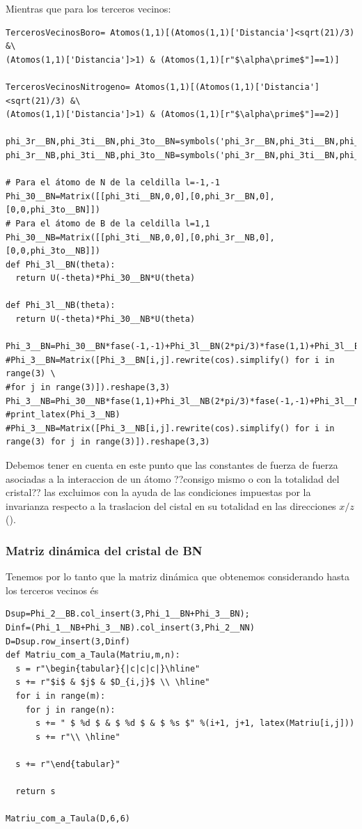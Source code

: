 \documentclass[12pt,a4paper]{article}
\begin{document}
\newpage

Mientras que para los terceros vecinos:
\begin{verbatim}
TercerosVecinosBoro= Atomos(1,1)[(Atomos(1,1)['Distancia']<sqrt(21)/3) &\
(Atomos(1,1)['Distancia']>1) & (Atomos(1,1)[r"$\alpha\prime$"]==1)]

TercerosVecinosNitrogeno= Atomos(1,1)[(Atomos(1,1)['Distancia']<sqrt(21)/3) &\
(Atomos(1,1)['Distancia']>1) & (Atomos(1,1)[r"$\alpha\prime$"]==2)]

phi_3r__BN,phi_3ti__BN,phi_3to__BN=symbols('phi_3r__BN,phi_3ti__BN,phi_3to__BN')
phi_3r__NB,phi_3ti__NB,phi_3to__NB=symbols('phi_3r__BN,phi_3ti__BN,phi_3to__BN')

# Para el átomo de N de la celdilla l=-1,-1  
Phi_30__BN=Matrix([[phi_3ti__BN,0,0],[0,phi_3r__BN,0],[0,0,phi_3to__BN]])
# Para el átomo de B de la celdilla l=1,1
Phi_30__NB=Matrix([[phi_3ti__NB,0,0],[0,phi_3r__NB,0],[0,0,phi_3to__NB]])
def Phi_3l__BN(theta):
  return U(-theta)*Phi_30__BN*U(theta)

def Phi_3l__NB(theta):
  return U(-theta)*Phi_30__NB*U(theta)

Phi_3__BN=Phi_30__BN*fase(-1,-1)+Phi_3l__BN(2*pi/3)*fase(1,1)+Phi_3l__BN(-2*pi/3)*fase(-1,1)
#Phi_3__BN=Matrix([Phi_3__BN[i,j].rewrite(cos).simplify() for i in range(3) \
#for j in range(3)]).reshape(3,3)
Phi_3__NB=Phi_30__NB*fase(1,1)+Phi_3l__NB(2*pi/3)*fase(-1,-1)+Phi_3l__NB(-2*pi/3)*fase(1,-1)
#print_latex(Phi_3__NB)
#Phi_3__NB=Matrix([Phi_3__NB[i,j].rewrite(cos).simplify() for i in range(3) for j in range(3)]).reshape(3,3)
\end{verbatim}

Debemos tener en cuenta en este punto que las  constantes de fuerza de fuerza asociadas a la interaccion de un átomo \color{red}??consigo mismo o con la totalidad del cristal?? \normalcolor las excluimos con la ayuda de las condiciones impuestas por la invarianza respecto a la traslacion del cistal en su totalidad en las direcciones \(x/z\) (\cite{falkovsky08_symmet_const_phonon_disper_graph}).


\subsubsection{Matriz dinámica del cristal de BN}
\label{sec:org4d19fa5}

Tenemos por lo tanto que la matriz dinámica que obtenemos considerando hasta los terceros vecinos és
\begin{verbatim}
Dsup=Phi_2__BB.col_insert(3,Phi_1__BN+Phi_3__BN);
Dinf=(Phi_1__NB+Phi_3__NB).col_insert(3,Phi_2__NN)
D=Dsup.row_insert(3,Dinf)
def Matriu_com_a_Taula(Matriu,m,n):
  s = r"\begin{tabular}{|c|c|c|}\hline"
  s += r"$i$ & $j$ & $D_{i,j}$ \\ \hline"
  for i in range(m):
    for j in range(n):
      s += " $ %d $ & $ %d $ & $ %s $" %(i+1, j+1, latex(Matriu[i,j]))
      s += r"\\ \hline"

  s += r"\end{tabular}"

  return s

Matriu_com_a_Taula(D,6,6)
\end{verbatim}
\end{document}
